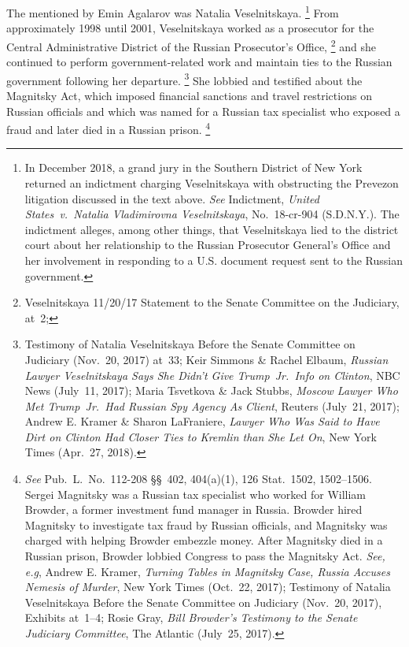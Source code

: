The  mentioned by Emin Agalarov was Natalia Veselnitskaya.%
\footnote{In December 2018, a grand jury in the Southern District of New York returned an indictment charging Veselnitskaya with obstructing the Prevezon litigation discussed in the text above.
\textit{See} Indictment, \textit{United States~v.\ Natalia Vladimirovna Veselnitskaya}, No.~18-cr-904 (S.D.N.Y.).
The indictment alleges, among other things, that Veselnitskaya lied to the district court about her relationship to the Russian Prosecutor General's Office and her involvement in responding to a U.S. document request sent to the Russian government.}
From approximately 1998 until 2001, Veselnitskaya worked as a prosecutor for the Central Administrative District of the Russian Prosecutor's Office,%
\footnote{Veselnitskaya 11/20/17 Statement to the Senate Committee on the Judiciary, at~2;
}
and she continued to perform government-related work and maintain ties to the Russian government following her departure.%
\footnote{Testimony of Natalia Veselnitskaya Before the Senate Committee on Judiciary (Nov.~20, 2017) at~33;
Keir Simmons \& Rachel Elbaum, \textit{Russian Lawyer Veselnitskaya Says She Didn't Give Trump~Jr.\ Info on Clinton}, NBC News (July~11, 2017);
Maria Tsvetkova \& Jack Stubbs, \textit{Moscow Lawyer Who Met Trump~Jr.\ Had Russian Spy Agency As Client}, Reuters (July~21, 2017);
Andrew E. Kramer \& Sharon LaFraniere, \textit{Lawyer Who Was Said to Have Dirt on Clinton Had Closer Ties to Kremlin than She Let On}, New York Times (Apr.~27, 2018).}
She lobbied and testified about the Magnitsky Act, which imposed financial sanctions and travel restrictions on Russian officials and which was named for a Russian tax specialist who exposed a fraud and later died in a Russian prison.%
\footnote{\textit{See} Pub.\ L.~No.~112-208 \S\S~402, 404(a)(1), 126 Stat.~1502, 1502--1506.
Sergei Magnitsky was a Russian tax specialist who worked for William Browder, a former investment fund manager in Russia.
Browder hired Magnitsky to investigate tax fraud by Russian officials, and Magnitsky was charged with helping Browder embezzle money.
After Magnitsky died in a Russian prison, Browder lobbied Congress to pass the Magnitsky Act.
\textit{See, e.g}, Andrew E. Kramer, \textit{Turning Tables in Magnitsky Case, Russia Accuses Nemesis of Murder}, New York Times (Oct.~22, 2017);
Testimony of Natalia Veselnitskaya Before the Senate Committee on Judiciary (Nov.~20, 2017), Exhibits at~1--4;
Rosie Gray, \textit{Bill Browder's Testimony to the Senate Judiciary Committee}, The Atlantic (July~25, 2017).}
